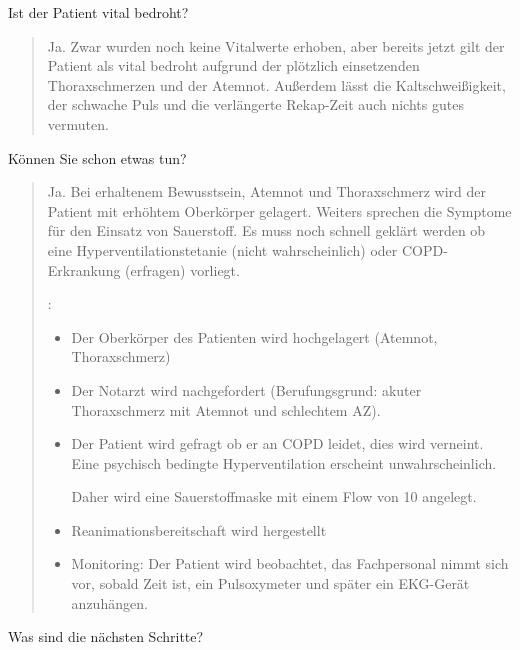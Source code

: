 \noindent Ist der Patient vital bedroht?
\begin{quote}
  Ja. Zwar wurden
  noch keine Vitalwerte erhoben, aber bereits jetzt gilt der
  Patient als vital bedroht aufgrund der plötzlich
  einsetzenden Thoraxschmerzen und der Atemnot. Außerdem
  lässt die Kaltschweißigkeit, der schwache Puls und die
  verlängerte Rekap-Zeit auch nichts gutes vermuten.
\end{quote}

\noindent Können Sie schon etwas tun?

\begin{quote}
  \marginlabel{\TxMassVit}Ja.  Bei erhaltenem Bewusstsein, Atemnot und
  Thoraxschmerz wird der Patient mit erhöhtem Oberkörper gelagert. Weiters sprechen
  die Symptome für den Einsatz von Sauerstoff. Es muss noch schnell geklärt werden
  ob eine Hyperventilationstetanie (nicht wahrscheinlich) oder COPD-Erkrankung
  (erfragen) vorliegt.
  
  \TxMassVit:
  
  \begin{itemize}
    \item Der Oberkörper des Patienten wird hochgelagert (Atemnot,
    Thoraxschmerz)
    \item Der Notarzt wird nachgefordert (Berufungsgrund: akuter
    Thoraxschmerz mit Atemnot und schlechtem AZ).
    \item Der Patient wird gefragt ob er an COPD leidet, dies wird verneint.
    Eine psychisch bedingte Hyperventilation erscheint unwahrscheinlich.
    
    Daher wird eine Sauerstoffmaske mit einem Flow von
    10{\LPerMin*} angelegt.
    \item Reanimationsbereitschaft wird hergestellt
    \item Monitoring: Der Patient wird beobachtet, das
    Fachpersonal nimmt sich vor, sobald Zeit ist, ein
    Pulsoxymeter und später ein EKG-Gerät anzuhängen.
  \end{itemize}
  
\end{quote}


\noindent Was sind die nächsten Schritte?

